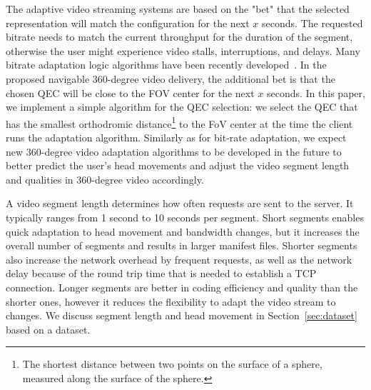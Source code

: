 The adaptive video streaming systems are based on the "bet" that the selected representation will match the configuration for the next $x$ seconds. The requested bitrate needs to match the current throughput for the duration of the segment, otherwise the user might experience video stalls, interruptions, and delays. Many bitrate adaptation logic algorithms have been recently developed~\cite{tian,probe_li_2014,miller,zou,liu}. In the proposed navigable 360-degree video delivery, the additional bet is that the chosen QEC will be close to the FOV center for the next $x$ seconds. In this paper, we implement a simple algorithm for the QEC selection: we select the QEC that has the smallest orthodromic distance\footnote{The shortest distance between two points on the surface of a sphere, measured along the surface of the sphere.} to the FoV center at the time the client runs the adaptation algorithm.
Similarly as for bit-rate adaptation, we expect new 360-degree video adaptation algorithms to be developed in the future to better predict the user's head movements and adjust the video segment length and qualities in 360-degree video accordingly. %


 A video segment length determines how often requests are sent to the server. It typically ranges from 1 second to 10 seconds per segment. Short segments enables quick adaptation to head movement and bandwidth changes, but it increases the overall number of segments and results in larger manifest files. Shorter segments also increase the network overhead by frequent requests, as well as the network delay because of the round trip time that is needed to establish a TCP connection.
Longer segments are better in coding efficiency and quality than the shorter ones, however it reduces the flexibility to adapt the video stream to changes. We discuss segment length and head movement in Section~\ref{sec:dataset} based on a dataset.

